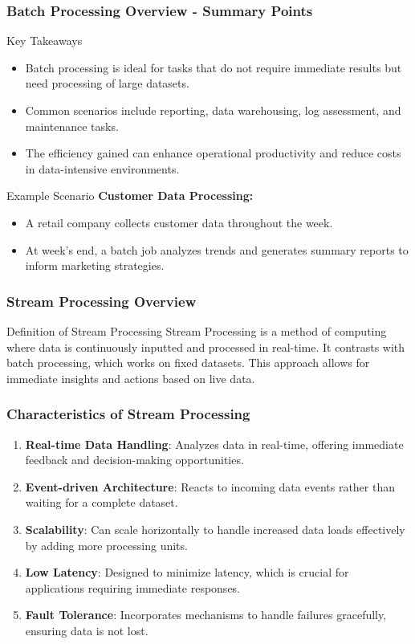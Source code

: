\documentclass[aspectratio=169]{beamer}
\begin{document}
\begin{frame}[fragile]
    \frametitle{Batch Processing Overview - Summary Points}
    \begin{block}{Key Takeaways}
        \begin{itemize}
            \item Batch processing is ideal for tasks that do not require immediate results but need processing of large datasets.
            \item Common scenarios include reporting, data warehousing, log assessment, and maintenance tasks.
            \item The efficiency gained can enhance operational productivity and reduce costs in data-intensive environments.
        \end{itemize}
    \end{block}

    \begin{block}{Example Scenario}
        \textbf{Customer Data Processing:}
        \begin{itemize}
            \item A retail company collects customer data throughout the week.
            \item At week's end, a batch job analyzes trends and generates summary reports to inform marketing strategies.
        \end{itemize}
    \end{block}
\end{frame}

\begin{frame}[fragile]
    \frametitle{Stream Processing Overview}
    \begin{block}{Definition of Stream Processing}
        Stream Processing is a method of computing where data is continuously inputted and processed in real-time. It contrasts with batch processing, which works on fixed datasets. This approach allows for immediate insights and actions based on live data.
    \end{block}
\end{frame}

\begin{frame}[fragile]
    \frametitle{Characteristics of Stream Processing}
    \begin{enumerate}
        \item \textbf{Real-time Data Handling}: Analyzes data in real-time, offering immediate feedback and decision-making opportunities.
        \item \textbf{Event-driven Architecture}: Reacts to incoming data events rather than waiting for a complete dataset.
        \item \textbf{Scalability}: Can scale horizontally to handle increased data loads effectively by adding more processing units.
        \item \textbf{Low Latency}: Designed to minimize latency, which is crucial for applications requiring immediate responses.
        \item \textbf{Fault Tolerance}: Incorporates mechanisms to handle failures gracefully, ensuring data is not lost.
    \end{enumerate}
\end{frame}
\end{document}
